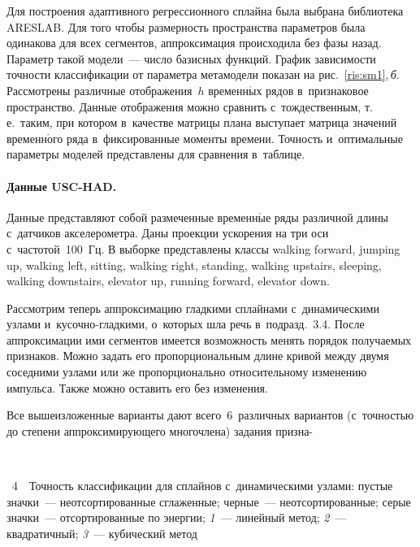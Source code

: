 \begin{multicols}{2}
Для построения адаптивного регрессионного сплайна была выбрана библиотека ARESLAB. 
Для того чтобы размерность пространства параметров была одинакова для всех 
сегментов, аппроксимация происходила без фазы назад. Параметр такой модели~--- 
число базисных функций. График зависимости точности классификации от параметра 
метамодели показан на рис.~\ref{ris:sm1},\,\textit{б}. Рассмотрены различные 
отображения~$h$ временн$\acute{\mbox{ы}}$х рядов в~признаковое пространство. 
Данные отображения можно сравнить с~тождественным, т.\,е.\ 
таким, при котором в~качестве матрицы плана выступает матрица значений временн$\acute{\mbox{о}}$го 
ряда в~фиксированные моменты времени. Точность и~оптимальные параметры моделей 
представлены для сравнения в~таблице. %



\vspace*{-9pt}

\paragraph*{Данные USC-HAD.} Данные представляют собой размеченные временн$\acute{\mbox{ы}}$е 
ряды различной длины с~датчиков акселерометра. Даны проекции ускорения на три 
оси с~частотой~100~Гц.
В выборке представлены классы walking forward, jumping up, 
walking left, sitting, walking right, standing, walking upstairs, 
sleeping, walking downstairs, elevator up, running forward, elevator down.


Рассмотрим теперь аппроксимацию гладкими сплайнами с~динамическими узлами  
и~ку\-соч\-но-глад\-ки\-ми, о~которых шла речь в~подразд.~3.4.
После аппроксимации ими сегментов имеется возможность менять порядок получаемых 
признаков.
Можно задать его пропорциональным длине кривой между двумя соседними 
узлами или же пропорционально относительному изменению импульса. 
Также можно оставить его без изменения.

Все вышеизложенные варианты дают всего~6~различных вариантов 
(с~точ\-ностью до степени аппроксимирующего многочлена) задания призна-\linebreak\vspace*{-12pt}

{ \begin{center}  %
 \vspace*{-4pt}
   \mbox{%
 \epsfxsize=78.952mm 
 }


\end{center}


\noindent
{{\figurename~4}\ \ \small{Точность классификации для сплайнов с~динамическими узлами: пустые
    значки~--- неотсортированные сглаженные;
    черные~--- неотсортированные;
    серые значки~---  отсортированные по энергии; \textit{1}~---  линейный метод;
    \textit{2}~--- квадратичный; \textit{3}~--- кубический метод}}
}


\end{multicols}
